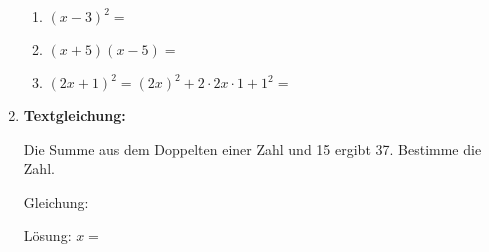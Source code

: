 \begin{enumerate}[label=\arabic*., resume]
    \vspace{0.5cm}

    \begin{enumerate}[label=\alph*)]
        \item $(x - 3)^2 = $ \underline{\hspace{4cm}}

        \vspace{0.3cm}

        \item $(x + 5)(x - 5) = $ \underline{\hspace{4cm}}

        \vspace{0.3cm}

        \item $(2x + 1)^2 = (2x)^2 + 2 \cdot 2x \cdot 1 + 1^2 = $ \underline{\hspace{4cm}}

    \end{enumerate}

    \vspace{1cm}

    \item \textbf{Textgleichung:}

    Die Summe aus dem Doppelten einer Zahl und 15 ergibt 37. Bestimme die Zahl.

    \vspace{0.5cm}

    Gleichung: \underline{\hspace{4cm}}

    Lösung: $x = $ \underline{\hspace{2cm}}

\end{enumerate}
